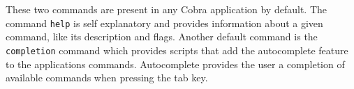 These two commands are present in any Cobra application by default. The command \texttt{help} is self explanatory and provides information about a given command, like its description and flags. Another default command is the \texttt{completion} command which provides scripts that add the autocomplete feature to the applications commands. Autocomplete provides the user a completion of available commands when pressing the tab key.